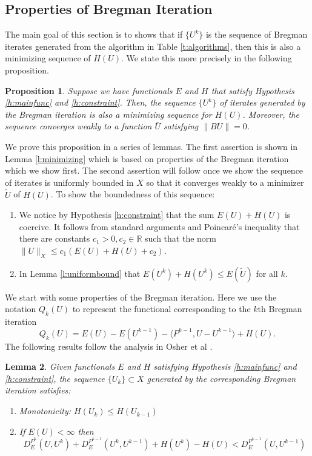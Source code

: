 \documentclass[11pt]{article}
\newcommand{\R}{\mathbb{R}}
\theoremstyle{plain}
\newtheorem{Lemma}{Lemma}[section]
\newtheorem{Proposition}[Lemma]{Proposition}
\begin{document}
\subsection{Properties of Bregman Iteration}
The main goal of this section is to shows that if $\{ U^k\}$ is the sequence of Bregman iterates generated from the algorithm in Table \ref{t:algorithms}, then this is also a minimizing sequence of $H(U)$. We state this more precisely in the following proposition.

\begin{Proposition}
Suppose we have functionals $E$ and $H$ that satisfy Hypothesis \ref{h:mainfunc} and \ref{h:constraint}. Then, the sequence $\{U^k \}$ of iterates generated by the Bregman iteration is also a minimizing sequence for $H(U)$. Moreover, the sequence converges weakly to a function $\bar{U}$ satisfying $\|BU\|=0$.
\end{Proposition}

We prove this proposition in a series of lemmas. The first assertion is shown in Lemma \ref{l:minimizing} which is based on properties of the Bregman iteration  which we show first. The second assertion will follow once we show the sequence of iterates is uniformly bounded in $X$ so that it converges weakly to a minimizer $\tilde{U}$ of $H(U)$. To show the boundedness of this sequence:
\begin{enumerate}
\item We notice by Hypothesis \ref{h:constraint} that the sum $E(U) +H(U)$ is coercive. It follows from standard arguments and Poincar\'e's inequality that there are constants $c_1>0, c_2 \in \R$ such that the norm $\|U \|_X \leq c_1 (E(U) + H(U)+ c_2)$.
\item In Lemma \ref{l:uniformbound} that $E(U^k) +H(U^k) \leq E(\tilde{U}) $ for all $k$.
\end{enumerate}


We start with some properties of the Bregman iteration. Here we use the notation $Q_k(U)$ to represent the functional corresponding to the $k$th Bregman iteration
\[Q_k(U) = E(U) - E(U^{k-1}) - \langle P^{k-1}, U-U^{k-1} \rangle + H(U).\]
The following results follow the analysis in Osher et al \cite{osher2005}.
\begin{Lemma}\label{l:properties}
Given functionals $E$ and $H$ satisfying Hypothesis \ref{h:mainfunc} and \ref{h:constraint}, the sequence $\{U_k\} \subset X$ generated by the corresponding Bregman iteration satisfies:
\begin{enumerate}
\item Monotonicity: $H(U_k) \leq H(U_{k-1})$
\item If $E(U)< \infty$ then
\[ D^{P^k}_E( U,U^k) + D^{P^{k-1}}_E(U^k,U^{k-1})+H(U^k)-H(U)< D^{P^{k-1}}_E(U,U^{k-1}) \]
\end{enumerate}
\end{Lemma}
\end{document}
